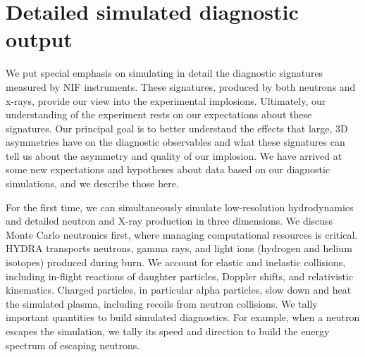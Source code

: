 \documentclass[aip,pop,numerical,reprint,floatfix]{revtex4-1}
\begin{document}
\section{\label{sec:sim_diagnostics}Detailed simulated diagnostic output}

We put special emphasis on simulating in detail the diagnostic signatures
measured by NIF instruments. These signatures, produced by both neutrons
and x-rays, provide our view into the experimental implosions. Ultimately,
our understanding of the experiment rests on our expectations about
these signatures. Our principal goal is to better understand the effects
that large, 3D asymmetries have on the diagnostic observables and
what these signatures can tell us about the asymmetry and quality
of our implosion. We have arrived at some new expectations and hypotheses
about data based on our diagnostic simulations, and we describe those
here.

For the first time, we can simultaneously simulate low-resolution
hydrodynamics and detailed neutron and X-ray production in three dimensions.
We discuss Monte Carlo neutronics first, where managing computational
resources is critical. HYDRA transports neutrons, gamma rays, and
light ions (hydrogen and helium isotopes) produced during burn. We
account for elastic and inelastic collisions, including in-flight
reactions of daughter particles, Doppler shifts, and relativistic
kinematics. Charged particles, in particular alpha particles, slow
down and heat the simulated plasma, including recoils from neutron
collisions. We tally important quantities to build simulated diagnostics.
For example, when a neutron escapes the simulation, we tally its speed
and direction to build the energy spectrum of escaping neutrons. 
\end{document}
